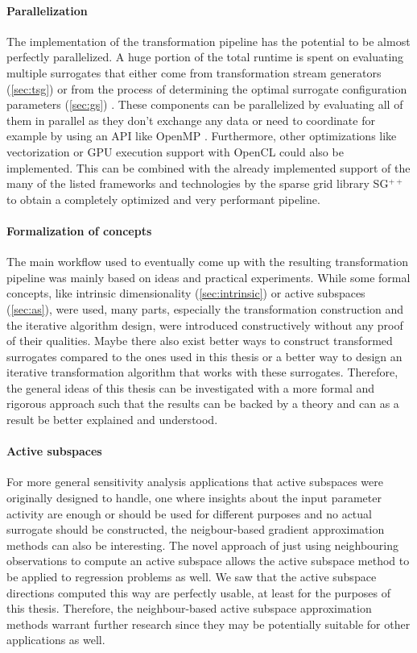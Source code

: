 \documentclass[
  a4paper,  %
  twoside,  %
  bibliography=totoc,
  headsepline,
  cleardoublepage=empty,
  parskip=half,
  draft=false
]{scrbook}
\begin{document}
\paragraph{Parallelization}
The implementation of the transformation pipeline has the potential to be almost perfectly parallelized.
A huge portion of the total runtime is spent on evaluating multiple surrogates that either come from transformation stream generators (\cref{sec:tsg}) or from the process of determining the optimal surrogate configuration parameters (\cref{sec:gs}) .
These components can be parallelized by evaluating all of them in parallel as they don't exchange any data or need to coordinate for example by using an API like OpenMP \cite{openmp08}.
Furthermore, other optimizations like vectorization \cite{Maleki2011} or GPU execution support with OpenCL \cite{Stone2010} could also be implemented.
This can be combined with the already implemented support of the many of the listed frameworks and technologies by the sparse grid library SG$^{++}$ to obtain a completely optimized and very performant pipeline.

\paragraph{Formalization of concepts}
The main workflow used to eventually come up with the resulting transformation pipeline was mainly based on ideas and practical experiments.
While some formal concepts, like intrinsic dimensionality (\cref{sec:intrinsic}) or active subspaces (\cref{sec:as}), were used, many parts, especially the transformation construction and the iterative algorithm design, were introduced constructively without any proof of their qualities.
Maybe there also exist better ways to construct transformed surrogates compared to the ones used in this thesis or a better way to design an iterative transformation algorithm that works with these surrogates.
Therefore, the general ideas of this thesis can be investigated with a more formal and rigorous approach such that the results can be backed by a theory and can as a result be better explained and understood.

\paragraph{Active subspaces}
For more general sensitivity analysis applications that active subspaces were originally designed to handle, \ie one where insights about the input parameter activity are enough or should be used for different purposes and no actual surrogate should be constructed, the neigbour-based gradient approximation methods can also be interesting.
The novel approach of just using neighbouring observations to compute an active subspace allows the active subspace method to be applied to regression problems as well.
We saw that the active subspace directions computed this way are perfectly usable, at least for the purposes of this thesis.
Therefore, the neighbour-based active subspace approximation methods warrant further research since they may be potentially suitable for other applications as well.
\end{document}
